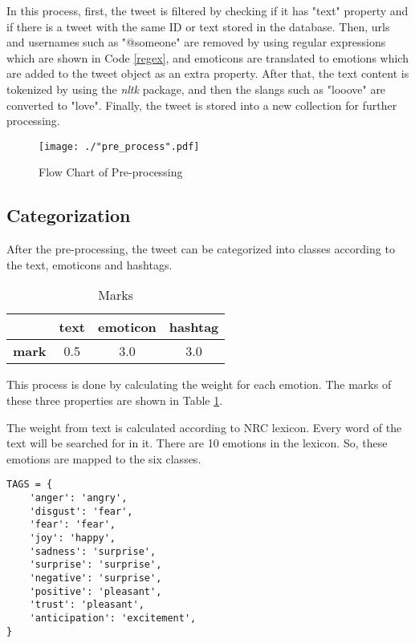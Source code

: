 In this process, first, the tweet is filtered by checking if it has "text" property and if there is a tweet with the same ID or text stored in the database. Then, urls and usernames such as "@someone" are removed by using regular expressions which are shown in Code \ref{regex}, and emoticons are translated to emotions which are added to the tweet object as an extra property. After that, the text content is tokenized by using the \textit{nltk} package, and then the slangs such as "looove" are converted to "love". Finally, the tweet is stored into a new collection for further processing.

\begin{figure}[ht]
    \centering
    \texttt{[image: ./"pre\_process".pdf]}
    \caption{Flow Chart of Pre-processing}
    \label{pre_processing}
\end{figure}

\subsection{Categorization}

After the pre-processing, the tweet can be categorized into classes according to the text, emoticons and hashtags.

\begin{table}[ht]
    \centering
    \begin{tabular}{|l|l|l|l|}
        \hline
         & text & emoticon & hashtag \\ \hline
        \textbf{mark} & \multicolumn{1}{c|}{0.5} & \multicolumn{1}{c|}{3.0} & \multicolumn{1}{c|}{3.0} \\ \hline
    \end{tabular}
    \caption{Marks}
    \label{marks}
\end{table}

This process is done by calculating the weight for each emotion. The marks of these three properties are shown in Table \ref{marks}.

The weight from text is calculated according to NRC lexicon. Every word of the text will be searched for in it. There are 10 emotions in the lexicon. So, these emotions are mapped to the six classes.

\begin{lstlisting}[caption={NRC Lexicon Map},captionpos=b,label={nrc}]
TAGS = {
    'anger': 'angry',
    'disgust': 'fear',
    'fear': 'fear',
    'joy': 'happy',
    'sadness': 'surprise',
    'surprise': 'surprise',
    'negative': 'surprise',
    'positive': 'pleasant',
    'trust': 'pleasant',
    'anticipation': 'excitement',
}
\end{lstlisting}

